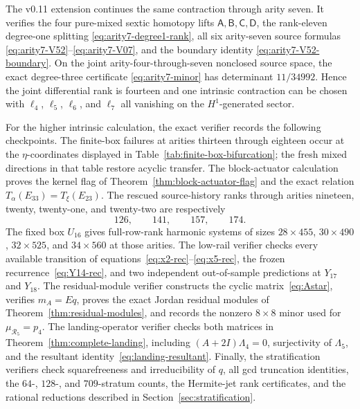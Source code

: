 \documentclass[11pt]{amsart}
\begin{document}
The v0.11 extension continues the same contraction through arity seven.  It verifies the four pure-mixed sextic homotopy lifts $\mathsf A,\mathsf B,\mathsf C,\mathsf D$, the rank-eleven degree-one splitting \eqref{eq:arity7-degree1-rank}, all six arity-seven source formulas \eqref{eq:arity7-V52}--\eqref{eq:arity7-V07}, and the boundary identity \eqref{eq:arity7-V52-boundary}.  On the joint arity-four-through-seven nonclosed source space, the exact degree-three certificate \eqref{eq:arity7-minor} has determinant $11/34992$.  Hence the joint differential rank is fourteen and one intrinsic contraction can be chosen with $\ell_4$, $\ell_5$, $\ell_6$, and $\ell_7$ all vanishing on the $H^1$-generated sector.



For the higher intrinsic calculation, the exact verifier records the following checkpoints.  The finite-box failures at arities thirteen through eighteen occur at the $\eta$-coordinates displayed in Table~\ref{tab:finite-box-bifurcation}; the fresh mixed directions in that table restore acyclic transfer.  The block-actuator calculation proves the kernel flag of Theorem~\ref{thm:block-actuator-flag} and the exact relation $T_\alpha(E_{33})=T_\xi(E_{23})$.  The rescued source-history ranks through arities nineteen, twenty, twenty-one, and twenty-two are respectively
\[
126,\qquad141,\qquad157,\qquad174.
\]
The fixed box $U_{16}$ gives full-row-rank harmonic systems of sizes $28\times455$, $30\times490$, $32\times525$, and $34\times560$ at those arities.  The low-rail verifier checks every available transition of equations~\eqref{eq:x2-rec}--\eqref{eq:x5-rec}, the frozen recurrence~\eqref{eq:Y14-rec}, and two independent out-of-sample predictions at $Y_{17}$ and $Y_{18}$.  The residual-module verifier constructs the cyclic matrix~\eqref{eq:Astar}, verifies $m_A=Eq$, proves the exact Jordan residual modules of Theorem~\ref{thm:residual-modules}, and records the nonzero $8\times8$ minor used for $\mu_{\mathcal R_5}=p_4$.  The landing-operator verifier checks both matrices in Theorem~\ref{thm:complete-landing}, including $(A+2I)\Lambda_4=0$, surjectivity of $\Lambda_5$, and the resultant identity~\eqref{eq:landing-resultant}.  Finally, the stratification verifiers check squarefreeness and irreducibility of $q$, all gcd truncation identities, the $64$-, $128$-, and $709$-stratum counts, the Hermite-jet rank certificates, and the rational reductions described in Section~\ref{sec:stratification}.
\end{document}
